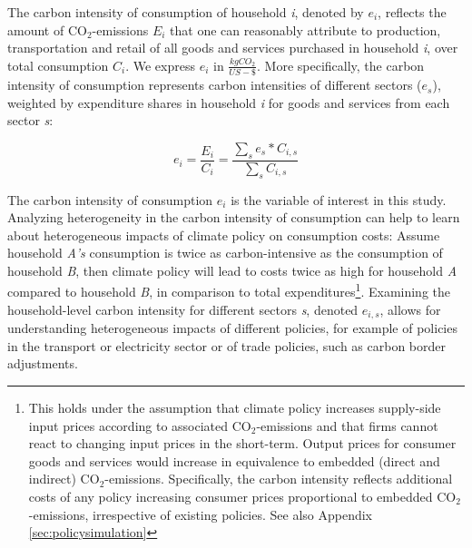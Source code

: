 \documentclass[12pt, a4paper]{article}
\begin{document}

The carbon intensity of consumption of household \textit{i}, denoted by $e_{i}$, reflects the amount of CO$_{2}$-emissions $E_{i}$ that one can reasonably attribute to production, transportation and retail of all goods and services purchased in household \textit{i}, over total consumption $C_{i}$. We express $e_{i}$ in $\frac{kgCO_{2}}{US-\$}$. More specifically, the carbon intensity of consumption represents carbon intensities of different sectors ($e_{s}$), weighted by expenditure shares in household \textit{i} for goods and services from each sector \textit{s}:


\begin{equation} \label{eq:ei}
e_{i} = \frac{E_{i}}{C_{i}} = \frac{\sum_{s} e_{s}*C_{i,s}}{\sum_{s} C_{i,s}}
\end{equation}


The carbon intensity of consumption $e_{i}$ is the variable of interest in this study. Analyzing heterogeneity in the carbon intensity of consumption can help to learn about heterogeneous impacts of climate policy on consumption costs: Assume household \textit{A's} consumption is twice as carbon-intensive as the consumption of household \textit{B}, then climate policy will lead to costs twice as high for household \textit{A} compared to household \textit{B}, in comparison to total expenditures\footnote{This holds under the assumption that climate policy increases supply-side input prices according to associated CO$_{2}$-emissions and that firms cannot react to changing input prices in the short-term. Output prices for consumer goods and services would increase in equivalence to embedded (direct and indirect) CO$_{2}$-emissions. Specifically, the carbon intensity reflects additional costs of any policy increasing consumer prices proportional to embedded CO$_{2}$-emissions, irrespective of existing policies. See also Appendix \ref{sec:policysimulation}}. Examining the household-level carbon intensity for different sectors \textit{s}, denoted $e_{i,s}$, allows for understanding heterogeneous impacts of different policies, for example of policies in the transport or electricity sector or of trade policies, such as carbon border adjustments.
\end{document}
